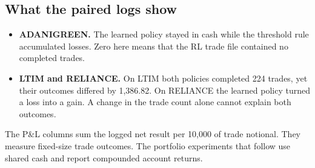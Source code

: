 \documentclass[12pt,a4paper,twoside,openany]{report}
\begin{document}
\subsection*{What the paired logs show}
\begin{itemize}\item \textbf{ADANIGREEN.} The learned policy stayed in cash while the threshold rule accumulated losses. Zero here means that the RL trade file contained no completed trades.\end{itemize}
\begin{itemize}\item \textbf{LTIM and RELIANCE.} On LTIM both policies completed 224 trades, yet their outcomes differed by 1,386.82. On RELIANCE the learned policy turned a loss into a gain. A change in the trade count alone cannot explain both outcomes.\end{itemize}
The P\&L columns sum the logged net result per 10,000 of trade notional. They measure fixed-size trade outcomes. The portfolio experiments that follow use shared cash and report compounded account returns.\par
\end{document}
